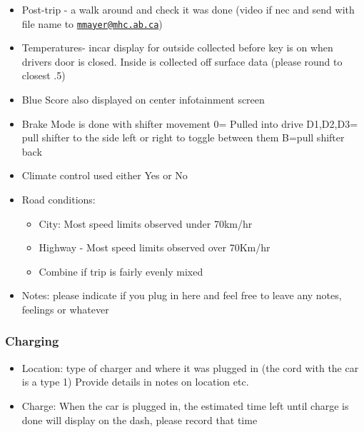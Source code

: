 \documentclass[]{article}
\providecommand{\tightlist}{%
  \setlength{\itemsep}{0pt}\setlength{\parskip}{0pt}}
\begin{document}
\begin{itemize}
\item
  Post-trip - a walk around and check it was done (video if nec and send
  with file name to
  \href{mailto:mmayer@mhc.ab.ca}{\nolinkurl{mmayer@mhc.ab.ca}})
\item
  Temperatures- incar display for outside collected before key is on
  when drivers door is closed. Inside is collected off surface data
  (please round to closest .5)
\item
  Blue Score also displayed on center infotainment screen
\item
  Brake Mode is done with shifter movement 0= Pulled into drive
  D1,D2,D3= pull shifter to the side left or right to toggle between
  them B=pull shifter back
\item
  Climate control used either Yes or No
\item
  Road conditions:

  \begin{itemize}
  \tightlist
  \item
    City: Most speed limits observed under 70km/hr
  \item
    Highway - Most speed limits observed over 70Km/hr
  \item
    Combine if trip is fairly evenly mixed
  \end{itemize}
\item
  Notes: please indicate if you plug in here and feel free to leave any
  notes, feelings or whatever
\end{itemize}

\hypertarget{charging}{%
\subsubsection{Charging}\label{charging}}

\begin{itemize}
\item
  Location: type of charger and where it was plugged in (the cord with
  the car is a type 1) Provide details in notes on location etc.
\item
  Charge: When the car is plugged in, the estimated time left until
  charge is done will display on the dash, please record that time
\end{itemize}
\end{document}
